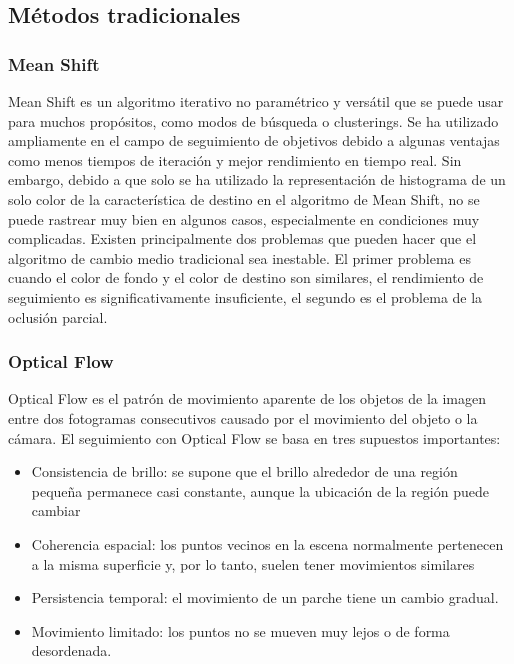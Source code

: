 \subsection{Métodos tradicionales}
\label{subsec:metodos-tradicionales-seguimiento}

\subsubsection*{Mean Shift}
\label{subsubsec:mean-shift}

Mean Shift es un algoritmo iterativo no paramétrico y versátil que se puede usar para muchos propósitos, como modos de búsqueda o clusterings. Se ha utilizado ampliamente en el campo de seguimiento de objetivos debido a algunas ventajas como menos tiempos de iteración y mejor rendimiento en tiempo real. Sin embargo, debido a que solo se ha utilizado la representación de histograma de un solo color de la característica de destino en el algoritmo de Mean Shift, no se puede rastrear muy bien en algunos casos, especialmente en condiciones muy complicadas. Existen principalmente dos problemas que pueden hacer que el algoritmo de cambio medio tradicional sea inestable. El primer problema es cuando el color de fondo y el color de destino son similares, el rendimiento de seguimiento es significativamente insuficiente, el segundo es el problema de la oclusión parcial.

\subsubsection*{Optical Flow}
\label{subsubsec:optical-flow}

Optical Flow es el patrón de movimiento aparente de los objetos de la imagen entre dos fotogramas consecutivos causado por el movimiento del objeto o la cámara. El seguimiento con Optical Flow se basa en tres supuestos importantes:

\begin{itemize}
    \item Consistencia de brillo: se supone que el brillo alrededor de una región pequeña permanece casi constante, aunque la ubicación de la región puede cambiar
    \item Coherencia espacial: los puntos vecinos en la escena normalmente pertenecen a la misma superficie y, por lo tanto, suelen tener movimientos similares
    \item Persistencia temporal: el movimiento de un parche tiene un cambio gradual.
    \item Movimiento limitado: los puntos no se mueven muy lejos o de forma desordenada.
\end{itemize}

